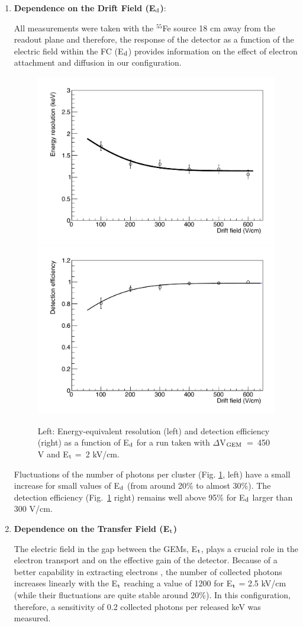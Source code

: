 \documentclass[a4paper]{jpconf}
\begin{document}
\begin{enumerate}
\item \textbf{Dependence on the Drift Field (E$_{\rm d}$)}:

All measurements were taken with the $^{55}$Fe source 18 cm away from
the readout plane and therefore, the response of the detector as a
function of the electric field within the FC (E$_{\rm d}$) provides
information on the effect of electron attachment and diffusion in our
configuration.

\begin{figure}[htbp]
\centering
\includegraphics[width=.45\textwidth]{gEnergyRes_Edrift.pdf}
\includegraphics[width=.45\textwidth]{gEff_Edrift.pdf}
\caption{Left: Energy-equivalent resolution (left) and detection
  efficiency (right) as a function of E$_{\rm d}$ for a run taken with
  $\Delta$V$_{\rm GEM}$~=~450 V and E$_{\rm t}$ =~2 kV/cm.}
\label{fig:Ed1}
\end{figure}
Fluctuations of the number of photons per cluster (Fig. \ref{fig:Ed1},
left) have a small increase for small values of E$_{\rm d}$ (from
around 20\% to almost 30\%).  The detection efficiency
(Fig.~\ref{fig:Ed1} right) remains well above 95\% for E$_{\rm d}$
larger than 300 V/cm.

\item \textbf{Dependence on the Transfer Field (E$_{\rm t}$)}

The electric field in the gap between the GEMs, E$_{\rm t}$, plays a
crucial role in the electron transport and on the effective gain of
the detector.  Because of a better capability in extracting electrons
\cite{bib:thesis}, the number of collected photons increases linearly
with the E$_{\rm t}$ reaching a value of 1200 for E$_{\rm t}$ = 2.5
kV/cm (while their fluctuations are quite stable around 20\%).  In
this configuration, therefore, a sensitivity of 0.2 collected photons
per released keV was measured.

\end{enumerate}
\end{document}

